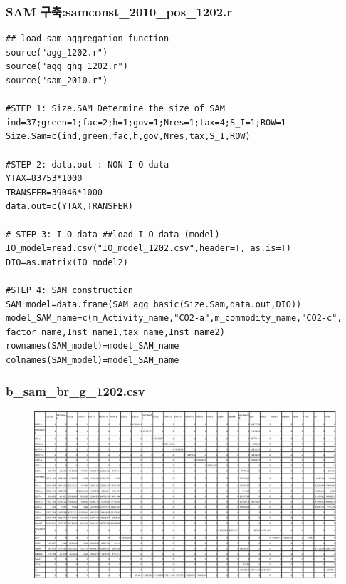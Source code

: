 \documentclass{beamer}
\begin{document}
\begin{frame}[fragile]
	\frametitle{SAM 구축:samconst\_2010\_pos\_1202.r}
\begin{scriptsize}
	\begin{verbatim}
## load sam aggregation function
source("agg_1202.r")
source("agg_ghg_1202.r")
source("sam_2010.r")

#STEP 1: Size.SAM Determine the size of SAM   
ind=37;green=1;fac=2;h=1;gov=1;Nres=1;tax=4;S_I=1;ROW=1
Size.Sam=c(ind,green,fac,h,gov,Nres,tax,S_I,ROW)

#STEP 2: data.out : NON I-O data
YTAX=83753*1000
TRANSFER=39046*1000
data.out=c(YTAX,TRANSFER)

# STEP 3: I-O data ##load I-O data (model)
IO_model=read.csv("IO_model_1202.csv",header=T, as.is=T)
DIO=as.matrix(IO_model2)

#STEP 4: SAM construction
SAM_model=data.frame(SAM_agg_basic(Size.Sam,data.out,DIO))
model_SAM_name=c(m_Activity_name,"CO2-a",m_commodity_name,"CO2-c",
factor_name,Inst_name1,tax_name,Inst_name2)
rownames(SAM_model)=model_SAM_name
colnames(SAM_model)=model_SAM_name
		\end{verbatim}
\end{scriptsize}	
\end{frame}

\begin{frame}
	\frametitle{b\_sam\_br\_g\_1202.csv}

	\begin{figure}
		\centering
		\includegraphics[width=1.00\textwidth]{samex.png}
	\end{figure}
\end{frame}
\end{document}
